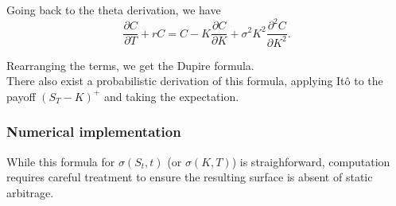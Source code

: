 Going back to the theta derivation, we have $$\dfrac{\partial C}{\partial T} + rC = C - K\dfrac{\partial C}{\partial K} + \sigma^2 K^2 \dfrac{\partial^2 C}{\partial K^2}.$$
 
Rearranging the terms, we get the Dupire formula.\\

There also exist a probabilistic derivation of this formula, applying Itô to the payoff $(S_T - K)^{+}$ and taking the expectation.

\subsubsection*{Numerical implementation}

While this formula for $\sigma(S_t, t)$ (or $\sigma(K, T)$) is straighforward, computation requires careful treatment to ensure the resulting surface is absent of static arbitrage.







